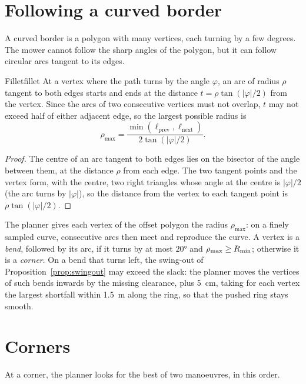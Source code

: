 \section{Following a curved border}

A curved border is a polygon with many vertices, each turning by a few
degrees. The mower cannot follow the sharp angles of the polygon, but it can
follow circular arcs tangent to its edges.

\begin{proposition}{Fillet}{fillet}
  At a vertex where the path turns by the angle $\varphi$, an arc of radius
  $\rho$ tangent to both edges starts and ends at the distance
  $t = \rho\tan(|\varphi|/2)$ from the vertex. Since the arcs of two
  consecutive vertices must not overlap, $t$ may not exceed half of either
  adjacent edge, so the largest possible radius is
  \[
    \rho_{\max} = \frac{\min(\ell_{\mathrm{prev}}, \ell_{\mathrm{next}})}
      {2\tan(|\varphi|/2)} .
  \]
\end{proposition}

\begin{proof}
  The centre of an arc tangent to both edges lies on the bisector of the
  angle between them, at the distance $\rho$ from each edge. The two
  tangent points and the vertex form, with the centre, two right triangles
  whose angle at the centre is $|\varphi|/2$ (the arc turns by $|\varphi|$),
  so the distance from the vertex to each tangent point is
  $\rho\tan(|\varphi|/2)$.
\end{proof}

The planner gives each vertex of the offset polygon the radius
$\rho_{\max}$: on a finely sampled curve, consecutive arcs then meet and
reproduce the curve. A vertex is a \emph{bend}, followed by its arc, if it
turns by at most $20°$ and $\rho_{\max} \ge R_{\min}$; otherwise it is a
\emph{corner}. On a bend that turns left, the swing-out of
Proposition~\ref{prop:swingout} may exceed the slack: the planner moves the
vertices of such bends inwards by the missing clearance, plus
\SI{5}{\centi\metre}, taking for each vertex the largest shortfall within
\SI{1.5}{\metre} along the ring, so that the pushed ring stays smooth.

\section{Corners}
\label{sec:corners}

At a corner, the planner looks for the best of two manoeuvres, in this
order.

